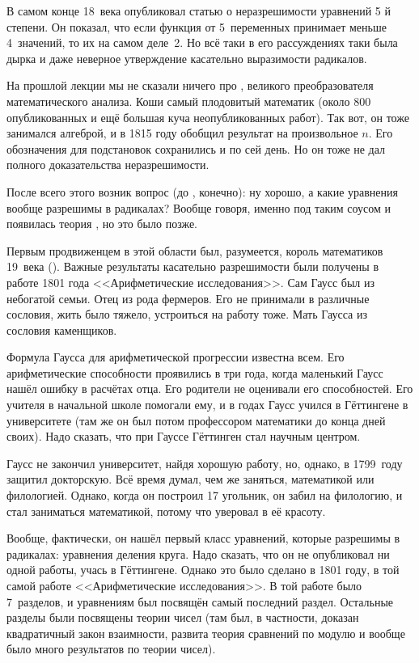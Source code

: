 \documentclass[a4paper,oneside,fleqn,10pt]{article}
\begin{document}
В самом конце 18~века  опубликовал статью о неразрешимости уравнений
5 й степени. Он показал, что если функция от 5~переменных принимает меньше 4~значений,
то их на самом деле~2. Но всё таки в его рассуждениях таки была дырка и даже неверное
утверждение касательно выразимости радикалов.

На прошлой лекции мы не сказали ничего про , великого преобразователя математического анализа.
Коши самый плодовитый математик (около 800 опубликованных и ещё большая куча неопубликованных работ).
Так вот, он тоже занимался алгеброй, и в 1815 году обобщил результат  на произвольное $n$.
Его обозначения для подстановок сохранились и по сей день. Но он тоже не дал полного доказательства
неразрешимости.

После всего этого возник вопрос (до , конечно): ну хорошо, а какие уравнения вообще разрешимы
в радикалах? Вообще говоря, именно под таким соусом и появилась теория , но это было позже.

Первым продвиженцем в этой области был, разумеется, король математиков 19~века
 ().
Важные результаты касательно разрешимости были получены в работе 1801 года <<Арифметические исследования>>.
Сам Гаусс был из небогатой семьи. Отец из рода фермеров. Его не принимали в различные сословия,
жить было тяжело, устроиться на работу тоже.
Мать Гаусса из сословия каменщиков.

Формула Гаусса для арифметической прогрессии известна всем. Его арифметические способности проявились в три года,
когда маленький Гаусс нашёл ошибку в расчётах отца.
Его родители не оценивали его способностей. Его учителя в начальной школе помогали ему,
и в  годах Гаусс учился в Гёттингене в университете
(там же он был потом профессором математики до конца дней своих).
Надо сказать, что при Гауссе Гёттинген стал научным центром.

Гаусс не закончил университет, найдя хорошую работу, но, однако, в 1799~году защитил докторскую.
Всё время думал, чем же заняться, математикой или филологией. Однако, когда он построил 17 угольник,
он забил на филологию, и стал заниматься математикой, потому что уверовал в её красоту.

Вообще, фактически, он нашёл первый класс уравнений, которые разрешимы в радикалах: уравнения деления круга.
Надо сказать, что он не опубликовал ни одной работы, учась в Гёттингене.
Однако это было сделано в 1801 году, в той самой работе <<Арифметические исследования>>.
В той работе было 7~разделов, и уравнениям был посвящён самый последний раздел.
Остальные разделы были посвящены теории чисел (там был, в частности, доказан квадратичный закон
взаимности, развита теория сравнений по модулю и вообще было много результатов по теории чисел).
\end{document}

